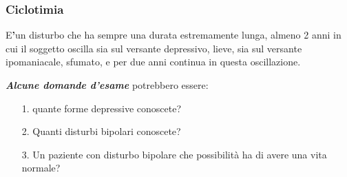 \subsubsection{Ciclotimia}

E\textbf{'}un disturbo che ha sempre una durata estremamente lunga,
almeno 2 anni in cui il soggetto oscilla sia sul versante depressivo,
lieve, sia sul versante ipomaniacale, sfumato, e per due anni continua
in questa oscillazione.

\emph{\textbf{Alcune domande d'esame}} potrebbero essere:

\begin{itemize}
\item[1.]
  quante forme depressive conoscete?
\item[2.]
  Quanti disturbi bipolari conoscete?
\item[3.]
  Un paziente con disturbo bipolare che possibilità ha di avere una vita
  normale?
\end{itemize}
